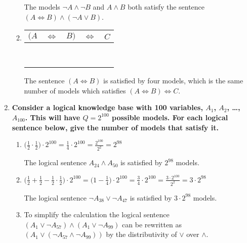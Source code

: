 \begin{enumerate}
\begin{enumerate}
The models $\neg A \land \neg B$ and $A \land B$ both satisfy the sentence $(A \Leftrightarrow B) \land (\neg A \lor B)$.

\item
\begin{tabular}{ccc|c|c}
$(A$ & $\Leftrightarrow$ & $B)$ & $\Leftrightarrow$ & $C$\\
\hline
\F & \T & \F & \F & \F\\
\F & \T & \F & \T & \T\\
\F & \F & \T & \T & \F\\
\F & \F & \T & \F & \T\\
\T & \F & \F & \T & \F\\
\T & \F & \F & \F & \T\\
\T & \T & \T & \F & \F\\
\T & \T & \T & \T & \T\\
\end{tabular}

The sentence $(A \Leftrightarrow B)$ is satisfied by four models, which is the same number of models which satisfies $(A \Leftrightarrow B) \Leftrightarrow C$.

\end{enumerate}

\item \textbf{Consider a logical knowledge base with 100 variables, $A_1$, $A_2$, \ldots, $A_{100}$. This will have $Q = 2^{100}$ possible models. For each logical sentence below, give the number of models that satisfy it.}

\begin{enumerate}

\item
$\big(\frac{1}{2} \cdot \frac{1}{2}\big) \cdot 2^{100} =
\frac{1}{4} \cdot 2^{100} =
\frac{2^{100}}{2^2} =
2^{98}$

The logical sentence $A_{24} \land A_{50}$ is satisfied by $2^{98}$ models.

\item
$\big(\frac{1}{2} + \frac{1}{2} - \frac{1}{2} \cdot \frac{1}{2}\big) \cdot 2^{100} =
\big(1 - \frac{1}{4}\big) \cdot 2^{100} =
\frac{3}{4} \cdot 2^{100} =
\frac{3 \cdot 2^{100}}{2^2} =
3 \cdot 2^{98}$

The logical sentence $\neg A_{38} \lor \neg A_{47}$ is satisfied by $3 \cdot 2^{98}$ models.

\item
To simplify the calculation the logical sentence $(A_{1} \lor \neg A_{57}) \land (A_{1} \lor \neg A_{99})$ can be rewritten as $(A_{1} \lor (\neg A_{57} \land \neg A_{99}))$ by the distributivity of $\lor$ over $\land$.


\end{enumerate}
\end{enumerate}
